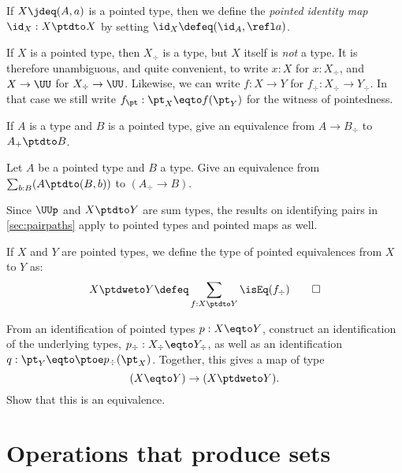 \begin{definition}\label{def:pointedidentity}
  If $X \jdeq (A,a)$ is a pointed type, then we define the \emph{pointed identity map}
  $\id_X : X \ptdto X$ by setting $\id_X \defeq (\id_A, \refl a)$.
\end{definition}

\begin{remark}\label{rem:coerceawaypt}
If $X$ is a pointed type, then $X_\div $ is a type, but $X$ itself is
\emph{not} a type. It is therefore unambiguous, and quite convenient,
to write $x:X$ for $x:X_\div$, and $X\to\UU$ for $X_\div\to\UU$.
Likewise, we can write $f : X \to Y$ for $f_\div : X_\div \to Y_\div$.
In that case we still write $f_\pt : \pt_X \eqto f(\pt_Y)$ for the
witness of pointedness.
\end{remark}

\begin{xca}\label{xca:plusforgetadjoint}
If $A$ is a type and $B$ is a pointed type,
give an equivalence from $A\to B_\div$ to $A_+\ptdto B$.
\end{xca}

\begin{xca}\label{xca:freemaps}
  Let $A$ be a pointed type and $B$ a type. Give an equivalence from
  $\sum_{b:B}(A\ptdto (B,b))$ to $(A_\div\to B)$.
\end{xca}

Since $\UUp$ and $X\ptdto Y$ are sum types, the results on identifying pairs
in \cref{sec:pairpaths} apply to pointed types and pointed maps as well.

\begin{definition}\label{def:pointedequiv}
  If $X$ and $Y$ are pointed types, we define the type of pointed equivalences
  from $X$ to $Y$ as:
  \[
    X \ptdweto Y \defeq \sum_{f : X \ptdto Y}\isEq(f_\div)\qedhere
  \]
\end{definition}
\begin{xca}\label{xca:pointedequiv}
  From an identification of pointed types $p : X \eqto Y$,
  construct an identification of the underlying types, $p_\div : X_\div \eqto Y_\div$,
  as well as an identification $q : \pt_Y \eqto \ptoe p_\div(\pt_X)$.
  Together, this gives a map of type
  \[
    (X \eqto Y) \to (X \ptdweto Y).
  \]
  Show that this is an equivalence.
\end{xca}

\section{Operations that produce sets}
\label{sec:operations-on-sets}

